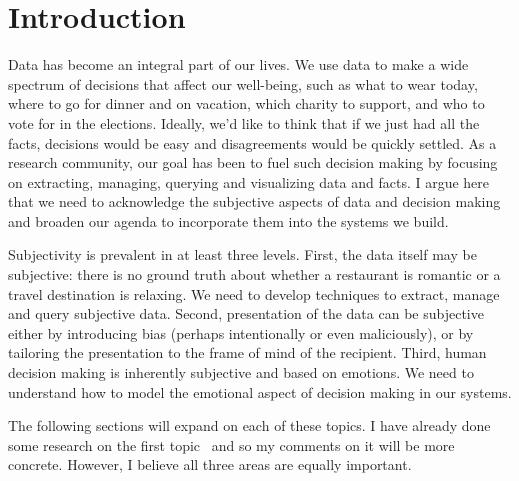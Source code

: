 \documentclass[11pt]{article}
\begin{document}


\section{Introduction}

Data has become an integral part of our lives. We use data to make a wide spectrum of decisions that affect our well-being, such as what to wear today, where to go for dinner and on vacation,  which charity to support, and who to vote for in the elections. Ideally, we'd like to think that if we just had all the facts,  decisions would be easy and disagreements would be quickly settled. As a research community, our goal has been to fuel such decision making by  focusing on  extracting, managing, querying and visualizing data and facts.  I argue here that we need to acknowledge the subjective aspects of data and decision making and broaden our agenda to incorporate them into the systems we build.  

Subjectivity is prevalent in at least three levels. First, the data itself may be subjective: there is no ground truth about whether a restaurant is romantic or a travel destination is relaxing. We need to develop techniques to extract, manage and query subjective data. Second, presentation of the data can be subjective either by introducing bias (perhaps intentionally or even maliciously), or by tailoring the presentation to the frame of mind of the recipient. Third, human decision making is inherently subjective and based on emotions. We need to understand how to model  the emotional aspect of decision making in our systems.  

The following sections will expand on each of these topics.  I have already done some research on the first topic~\cite{subjectivedatabases} and so my comments  on it will be more concrete. However, I believe all three areas are equally important.
\end{document}
